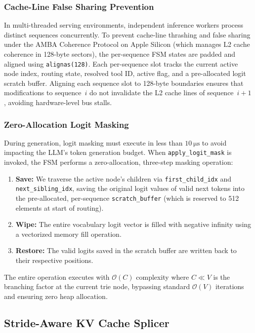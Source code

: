 \documentclass[conference,10pt]{IEEEtran}
\begin{document}
\subsubsection{Cache-Line False Sharing Prevention}
In multi-threaded serving environments, independent inference workers process distinct sequences concurrently. To prevent cache-line thrashing and false sharing under the AMBA Coherence Protocol on Apple Silicon (which manages L2 cache coherence in 128-byte sectors), the per-sequence FSM states are padded and aligned using \texttt{alignas(128)}. Each per-sequence slot tracks the current active node index, routing state, resolved tool ID, active flag, and a pre-allocated logit scratch buffer. Aligning each sequence slot to 128-byte boundaries ensures that modifications to sequence~$i$ do not invalidate the L2 cache lines of sequence~$i{+}1$, avoiding hardware-level bus stalls.

\subsubsection{Zero-Allocation Logit Masking}
During generation, logit masking must execute in less than $\SI{10}{\micro\second}$ to avoid impacting the LLM's token generation budget. When \texttt{apply\_logit\_mask} is invoked, the FSM performs a zero-allocation, three-step masking operation:
\begin{enumerate}
  \item \textbf{Save:} We traverse the active node's children via \texttt{first\_child\_idx} and \texttt{next\_sibling\_idx}, saving the original logit values of valid next tokens into the pre-allocated, per-sequence \texttt{scratch\_buffer} (which is reserved to 512 elements at start of routing).
  \item \textbf{Wipe:} The entire vocabulary logit vector is filled with negative infinity using a vectorized memory fill operation.
  \item \textbf{Restore:} The valid logits saved in the scratch buffer are written back to their respective positions.
\end{enumerate}

The entire operation executes with $\mathcal{O}(C)$ complexity where $C \ll V$ is the branching factor at the current trie node, bypassing standard $\mathcal{O}(V)$ iterations and ensuring zero heap allocation.

\subsection{Stride-Aware KV Cache Splicer}
\label{subsec:arch-splicer}
\end{document}
